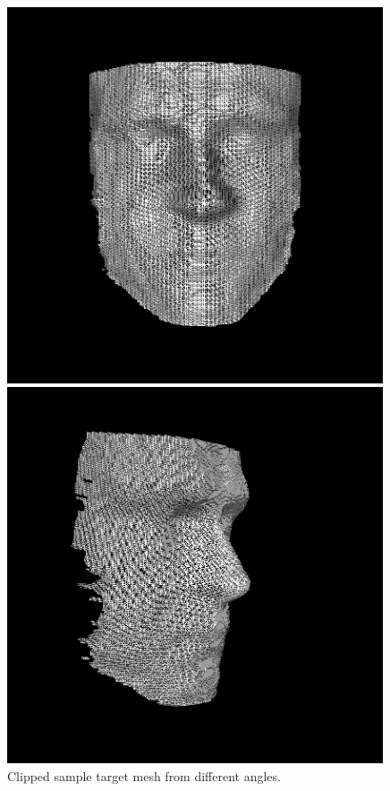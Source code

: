 \begin{figure}
\begin{minipage}{.32\textwidth}
    \includegraphics[width=0.99\textwidth]{Figures/Pictures/mesh_f.png}
  \end{minipage}
  \begin{minipage}{.32\textwidth}
    \centering
    \includegraphics[width=0.99\textwidth]{Figures/Pictures/mesh_l.png}
  \end{minipage}
  \caption{Clipped sample target mesh from different angles.}
  \label{f3.10}
\end{figure}

